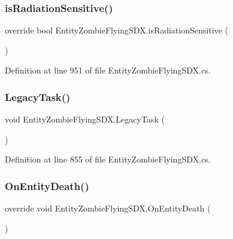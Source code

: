 \subsubsection{\texorpdfstring{isRadiationSensitive()}{isRadiationSensitive()}}
{\footnotesize\ttfamily override bool Entity\+Zombie\+Flying\+S\+D\+X.\+is\+Radiation\+Sensitive (\begin{DoxyParamCaption}{ }\end{DoxyParamCaption})\hspace{0.3cm}{\ttfamily [protected]}}



Definition at line 951 of file Entity\+Zombie\+Flying\+S\+D\+X.\+cs.

\mbox{\label{class_entity_zombie_flying_s_d_x_ad49759f36ac58d6488a113bb1af204ec}} 
\subsubsection{\texorpdfstring{LegacyTask()}{LegacyTask()}}
{\footnotesize\ttfamily void Entity\+Zombie\+Flying\+S\+D\+X.\+Legacy\+Task (\begin{DoxyParamCaption}{ }\end{DoxyParamCaption})\hspace{0.3cm}{\ttfamily [protected]}}



Definition at line 855 of file Entity\+Zombie\+Flying\+S\+D\+X.\+cs.

\mbox{\label{class_entity_zombie_flying_s_d_x_aad353bdf66779433ef8dbb285cc893c7}} 
\subsubsection{\texorpdfstring{OnEntityDeath()}{OnEntityDeath()}}
{\footnotesize\ttfamily override void Entity\+Zombie\+Flying\+S\+D\+X.\+On\+Entity\+Death (\begin{DoxyParamCaption}{ }\end{DoxyParamCaption})}



